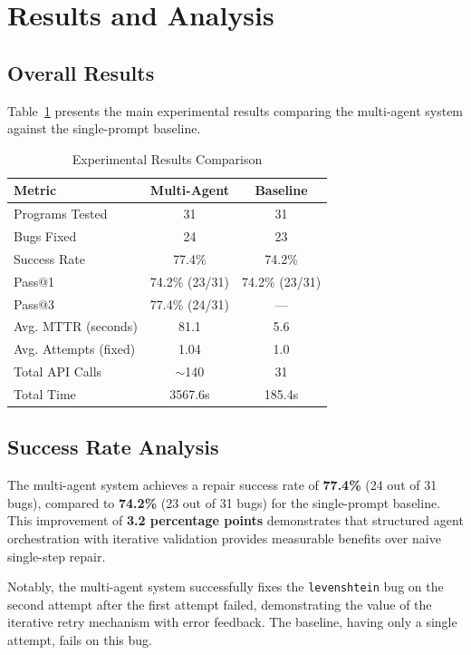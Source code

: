 \documentclass[conference]{IEEEtran}
\begin{document}
\section{Results and Analysis}

\subsection{Overall Results}
Table~\ref{tab:results} presents the main experimental results comparing the multi-agent system against the single-prompt baseline.

\begin{table}[htbp]
\caption{Experimental Results Comparison}
\label{tab:results}
\centering
\begin{tabular}{lcc}
\toprule
\textbf{Metric} & \textbf{Multi-Agent} & \textbf{Baseline} \\
\midrule
Programs Tested & 31 & 31 \\
Bugs Fixed & 24 & 23 \\
Success Rate & 77.4\% & 74.2\% \\
Pass@1 & 74.2\% (23/31) & 74.2\% (23/31) \\
Pass@3 & 77.4\% (24/31) & --- \\
Avg. MTTR (seconds) & 81.1 & 5.6 \\
Avg. Attempts (fixed) & 1.04 & 1.0 \\
Total API Calls & $\sim$140 & 31 \\
Total Time & 3567.6s & 185.4s \\
\bottomrule
\end{tabular}
\end{table}

\subsection{Success Rate Analysis}
The multi-agent system achieves a repair success rate of \textbf{77.4\%} (24 out of 31 bugs), compared to \textbf{74.2\%} (23 out of 31 bugs) for the single-prompt baseline. This improvement of \textbf{3.2 percentage points} demonstrates that structured agent orchestration with iterative validation provides measurable benefits over naive single-step repair.

Notably, the multi-agent system successfully fixes the \texttt{levenshtein} bug on the second attempt after the first attempt failed, demonstrating the value of the iterative retry mechanism with error feedback. The baseline, having only a single attempt, fails on this bug.
\end{document}
